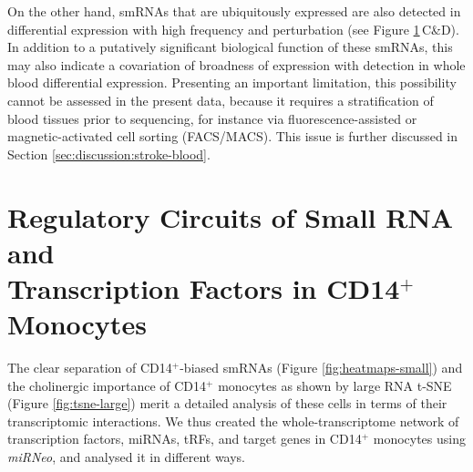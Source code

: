 \begin{figure}
{\label{fig:tsne-small}}
\end{figure}

On the other hand, smRNAs that are ubiquitously expressed are also detected in differential expression with high frequency and perturbation (see Figure \ref{fig:tsne-small}\,C\&D). In addition to a putatively significant biological function of these smRNAs, this may also indicate a covariation of broadness of expression with detection in whole blood differential expression. Presenting an important limitation, this possibility cannot be assessed in the present data, because it requires a stratification of blood tissues prior to sequencing, for instance via fluorescence-assisted or magnetic-activated cell sorting (FACS/MACS). This issue is further discussed in Section \ref{sec:discussion:stroke-blood}.


\section[Regulatory Circuits of Small RNA and Transcription Factors in CD14$^+$ Monocytes]{Regulatory Circuits of Small RNA and \\Transcription Factors in CD14$^+$ Monocytes}
The clear separation of CD14$^+$-biased smRNAs (Figure \ref{fig:heatmaps-small}) and the cholinergic importance of CD14$^+$ monocytes as shown by large RNA t-SNE (Figure \ref{fig:tsne-large}) merit a detailed analysis of these cells in terms of their transcriptomic interactions. We thus created the whole-transcriptome network of transcription factors, miRNAs, tRFs, and target genes in CD14$^+$ monocytes using \emph{miRNeo}, and analysed it in different ways.

